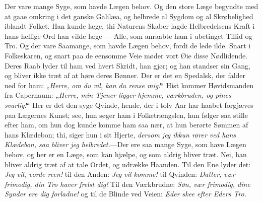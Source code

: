 \documentclass[12pt,a4paper]{book}
\begin{document}
Der vare mange Syge, som havde Lægen behov. Og den store Læge begyndte med at gaae
omkring i det ganske Galilæa, og helbrede al Sygdom og al Skrøbelighed iblandt Folket.
Han kunde læge, thi Naturens Skaber lagde Helbredelsens Kraft i hans hellige Ord han
vilde læge --- Alle, som anraabte ham i ubetinget Tillid og Tro. Og der vare Saamange,
som havde Lægen behov, fordi de lede ilde. Snart i Folkeskaren, og snart paa de
eensomme Veie møder vort Øie disse Nødlidende. Deres Raab lyder til ham ved hvert
Skridt, han gjør; og han standser sin Gang, og bliver ikke træt af at høre deres
Bønner. Der er det en Spedalsk, der falder ned for ham: „\emph{Herre, om du vil, kan du
rense mig!}“ Hist kommer Høvidsmanden fra Capernaum: „\emph{Herre, min Tjener ligger
hjemme, værkbruden, og pines svarlig!}“ Her er det den syge Qvinde, hende, der i tolv
Aar har haabet forgjæves paa Lægernes Kunst; see, hun søger ham i Folketrængslen, hun
følger saa stille efter ham, om hun dog kunde komme ham saa nær, at hun berørte Sømmen
af hans Klædebon; thi, siger hun i sit Hjerte, \emph{dersom jeg ikkun rører ved hans
Klædebon, saa bliver jeg helbredet.}---Der ere saa mange Syge, som have Lægen behov, og
her er en Læge, som kan hjælpe, og som aldrig bliver træt. Nei, han bliver aldrig træt
af at tale Ordet, og udrække Haanden. Til den Ene lyder det: \emph{Jeg vil, vorde
reen!} til den Anden: \emph{Jeg vil komme!} til Qvinden: \emph{Datter, vær frimodig,
din Tro haver frelst dig!} Til den Værkbrudne: \emph{Søn, vær frimodig, dine Synder ere
dig forladne!} og til de Blinde ved Veien: \emph{Eder skee efter Eders Tro.}
\end{document}
